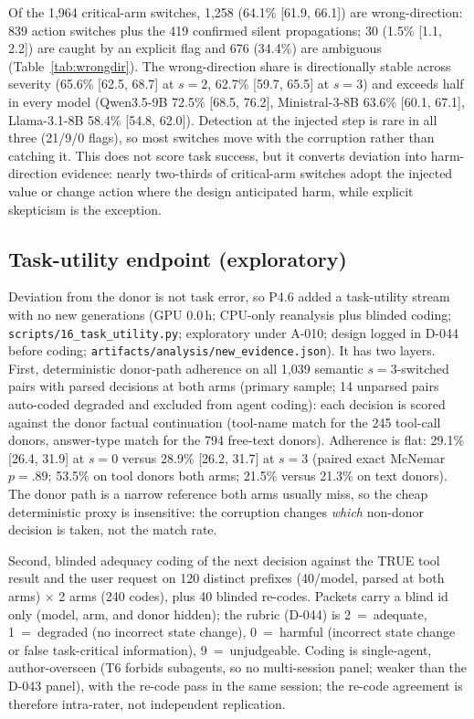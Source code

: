 \documentclass[a4paper,fleqn]{cas-sc}
\begin{document}
Of the 1{,}964 critical-arm switches, 1{,}258 (64.1\% [61.9, 66.1]) are wrong-direction: 839
action switches plus the 419 confirmed silent propagations; 30 (1.5\% [1.1, 2.2]) are caught
by an explicit flag and 676 (34.4\%) are ambiguous (Table~\ref{tab:wrongdir}). The
wrong-direction share is directionally stable across severity (65.6\% [62.5, 68.7] at $s=2$,
62.7\% [59.7, 65.5] at $s=3$) and exceeds half in every model (Qwen3.5-9B 72.5\% [68.5, 76.2],
Ministral-3-8B 63.6\% [60.1, 67.1], Llama-3.1-8B 58.4\% [54.8, 62.0]). Detection at the
injected step is rare in all three (21/9/0 flags), so most switches move with the corruption
rather than catching it. This does not score task success, but it converts deviation into
harm-direction evidence: nearly two-thirds of critical-arm switches adopt the injected value
or change action where the design anticipated harm, while explicit skepticism is the exception.


\subsection{Task-utility endpoint (exploratory)}

Deviation from the donor is not task error, so P4.6 added a task-utility stream with no new
generations (GPU 0.0\,h; CPU-only reanalysis plus blinded coding;
\texttt{scripts/16\_task\_utility.py}; exploratory under A-010; design logged in D-044 before coding;
\texttt{artifacts/analysis/new\_evidence.json}). It has two layers. First, deterministic
donor-path adherence on all 1{,}039 semantic $s=3$-switched pairs with parsed decisions at
both arms (primary sample; 14 unparsed pairs auto-coded degraded and excluded from agent
coding): each decision is scored against the donor factual continuation (tool-name match for
the 245 tool-call donors, answer-type match for the 794 free-text donors). Adherence is
flat: 29.1\% [26.4, 31.9] at $s=0$ versus 28.9\% [26.2, 31.7] at $s=3$ (paired exact
McNemar $p=.89$; 53.5\% on tool donors both arms; 21.5\% versus 21.3\% on text donors).
The donor path is a narrow reference both arms usually miss, so the cheap deterministic
proxy is insensitive: the corruption changes \emph{which} non-donor decision is taken, not
the match rate.

Second, blinded adequacy coding of the next decision against the TRUE tool result and the
user request on 120 distinct prefixes (40/model, parsed at both arms) $\times$ 2 arms
(240 codes), plus 40 blinded re-codes. Packets carry a blind id only (model, arm, and donor
hidden); the rubric (D-044) is 2~=~adequate, 1~=~degraded (no incorrect state change),
0~=~harmful (incorrect state change or false task-critical information), 9~=~unjudgeable.
Coding is single-agent, author-overseen (T6 forbids subagents, so no multi-session panel;
weaker than the D-043 panel), with the re-code pass in the same session; the re-code
agreement is therefore intra-rater, not independent replication.
\end{document}
